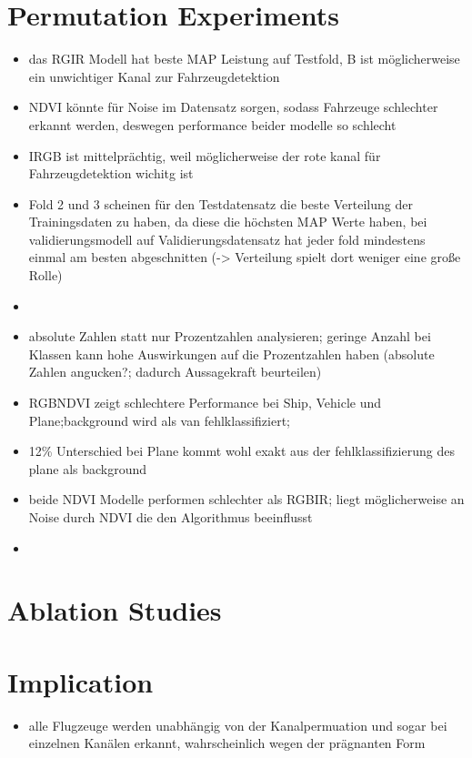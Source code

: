 \section*{Permutation Experiments}
\begin{itemize}
    \item das RGIR Modell hat beste MAP Leistung auf Testfold, B ist möglicherweise ein unwichtiger Kanal zur Fahrzeugdetektion
    \item NDVI könnte für Noise im Datensatz sorgen, sodass Fahrzeuge schlechter erkannt werden, deswegen performance beider modelle so schlecht
    \item IRGB ist mittelprächtig, weil möglicherweise der rote kanal für Fahrzeugdetektion wichitg ist 
    \item Fold 2 und 3 scheinen für den Testdatensatz die beste Verteilung der Trainingsdaten zu haben, da diese die höchsten MAP Werte haben, bei validierungsmodell auf Validierungsdatensatz hat jeder fold mindestens einmal am besten abgeschnitten (-> Verteilung spielt dort weniger eine große Rolle) 
\end{itemize}
\begin{itemize}
    \item {}
    \item absolute Zahlen statt nur Prozentzahlen analysieren; geringe Anzahl bei Klassen kann hohe Auswirkungen auf die Prozentzahlen haben (absolute Zahlen angucken?; dadurch Aussagekraft beurteilen)
\end{itemize}
\begin{itemize}
    \item \acrshort{RGBNDVI} zeigt schlechtere Performance bei Ship, Vehicle und Plane;background wird als van fehlklassifiziert; 
    \item 12\% Unterschied bei Plane kommt wohl exakt aus der fehlklassifizierung des plane als background
    \item beide NDVI Modelle performen schlechter als RGBIR; liegt möglicherweise an Noise durch NDVI die den Algorithmus beeinflusst
    \item 
\end{itemize}
\section*{Ablation Studies}
\section*{Implication}
\begin{itemize}
    \item alle Flugzeuge werden unabhängig von der Kanalpermuation und sogar bei einzelnen Kanälen erkannt, wahrscheinlich wegen der prägnanten Form 
\end{itemize}